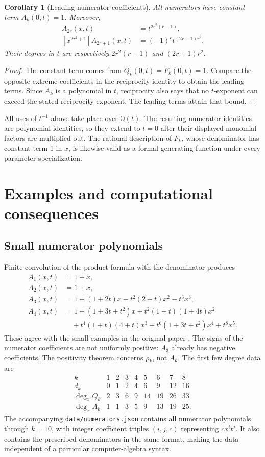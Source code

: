 \documentclass[11pt,letterpaper]{article}
\numberwithin{equation}{section}
\newtheorem{corollary}[theorem]{Corollary}
\theoremstyle{definition}
\newcommand{\Q}{\mathbb Q}
\begin{document}
\begin{corollary}[Leading numerator coefficients]\label{cor:Aleads}
All numerators have constant term \(A_k(0,t)=1\). Moreover,
\begin{align*}
 [x^{2r(r-1)+1}]A_{2r}(x,t)&=t^{2r^2(r-1)},\\
 [x^{2r^2+1}]A_{2r+1}(x,t)&=(-1)^r t^{(2r+1)r^2}.
\end{align*}
Their degrees in \(t\) are respectively \(2r^2(r-1)\) and
\((2r+1)r^2\).
\end{corollary}
\begin{proof}
The constant term comes from \(Q_k(0,t)=F_k(0,t)=1\).
Compare the opposite extreme coefficients in the reciprocity identity
to obtain the leading terms. Since \(A_k\) is a polynomial in \(t\),
reciprocity also says that no \(t\)-exponent can exceed the stated
reciprocity exponent. The leading terms attain that bound.
\end{proof}
All uses of \(t^{-1}\) above take place over \(\Q(t)\).
The resulting numerator identities are polynomial identities, so they
extend to \(t=0\) after their displayed monomial factors are multiplied
out. The rational description of \(F_k\), whose denominator has
constant term 1 in \(x\), is likewise valid as a formal generating
function under every parameter specialization.

\section{Examples and computational consequences}\label{sec:examples}
\subsection{Small numerator polynomials}
Finite convolution of the product formula with the denominator produces
\begin{align*}
 A_1(x,t)&=1+x,\\
 A_2(x,t)&=1+x,\\
 A_3(x,t)&=1+(1+2t)x-t^2(2+t)x^2-t^3x^3,\\
 A_4(x,t)&=1+(1+3t+t^2)x+t^2(1+t)(1+4t)x^2\\
 &\quad+t^4(1+t)(4+t)x^3
       +t^6(1+3t+t^2)x^4+t^8x^5.
\end{align*}
These agree with the small examples in the original paper
\cite[Section 5]{Cigler2021}. The signs of the numerator coefficients
are not uniformly positive: \(A_3\) already has negative coefficients.
The positivity theorem concerns \(\rho_k\), not \(A_k\).
The first few degree data are
\[
\begin{array}{c|rrrrrrrr}
 k&1&2&3&4&5&6&7&8\\ \hline
 d_k&0&1&2&4&6&9&12&16\\
 \deg_x Q_k&2&3&6&9&14&19&26&33\\
 \deg_x A_k&1&1&3&5&9&13&19&25.
\end{array}
\]
The accompanying \texttt{data/numerators.json} contains all numerator
polynomials through \(k=10\), with integer coefficient triples
\((i,j,c)\) representing \(cx^it^j\). It also contains the prescribed
denominators in the same format, making the data independent of a
particular computer-algebra syntax.
\end{document}
